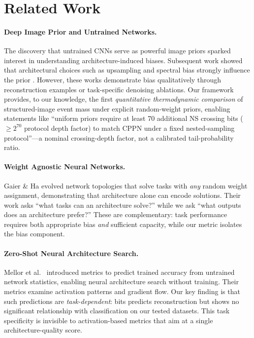 \documentclass{article}
\begin{document}
\section{Related Work}
\label{sec:related}


\paragraph{Deep Image Prior and Untrained Networks.}
The discovery that untrained CNNs serve as powerful image priors \cite{ulyanov2018deep} sparked interest in understanding architecture-induced biases. Subsequent work showed that architectural choices such as upsampling and spectral bias strongly influence the prior \cite{liu2023devil,shi2022spectral}. However, these works demonstrate bias qualitatively through reconstruction examples or task-specific denoising ablations. Our framework provides, to our knowledge, the first \emph{quantitative thermodynamic comparison} of structured-image event mass under explicit random-weight priors, enabling statements like ``uniform priors require at least 70 additional NS crossing bits ($\ge 2^{70}$ protocol depth factor) to match CPPN under a fixed nested-sampling protocol''---a nominal crossing-depth factor, not a calibrated tail-probability ratio.

\paragraph{Weight Agnostic Neural Networks.}
Gaier \& Ha \cite{gaier2019weight} evolved network topologies that solve tasks with \emph{any} random weight assignment, demonstrating that architecture alone can encode solutions. Their work asks ``what tasks can an architecture solve?'' while we ask ``what outputs does an architecture prefer?'' These are complementary: task performance requires both appropriate bias \emph{and} sufficient capacity, while our metric isolates the bias component.

\paragraph{Zero-Shot Neural Architecture Search.}
Mellor et al.\ \cite{mellor2021neural} introduced metrics to predict trained accuracy from untrained network statistics, enabling neural architecture search without training. Their metrics examine activation patterns and gradient flow. Our key finding is that such predictions are \emph{task-dependent}: bits predicts reconstruction but shows no significant relationship with classification on our tested datasets. This task specificity is invisible to activation-based metrics that aim at a single architecture-quality score.
\end{document}
